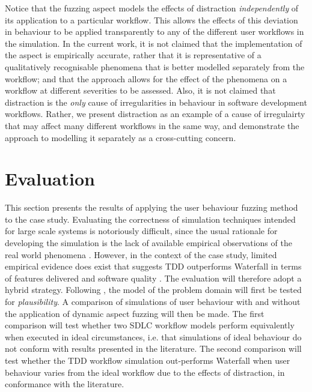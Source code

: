 \documentclass{llncs}
\begin{document}
Notice that the fuzzing aspect models the effects of distraction \emph{independently} of its application to a particular
workflow.  This allows the effects of this deviation in behaviour to be applied transparently to any of the different
user workflows in the simulation. In the current work, it is not claimed that the implementation of the aspect is
empirically accurate, rather that it is representative of a qualitatively recognisable phenomena that is better modelled
separately from the workflow; and that the approach allows for the effect of the phenomena on a workflow at different
severities to be assessed.  Also, it is not claimed that distraction is the \emph{only} cause of irregularities in
behaviour in software development workflows.  Rather, we present distraction as an example of a cause of irregulairty
that may affect many different workflows in the same way, and demonstrate the approach to modelling it separately as a
cross-cutting concern.
 

\section{Evaluation}
\label{sec:evaluation}


This section presents the results of applying the user behaviour fuzzing method to the case study.  Evaluating the
correctness of simulation techniques intended for large scale systems is notoriously difficult, since the usual
rationale for developing the simulation is the lack of available empirical observations of the real world phenomena
\citet{naylor67verification}.  However, in the context of the case study, limited empirical evidence does exist that
suggests TDD outperforms Waterfall in terms of features delivered and software quality
\citep{Bhat2006TestDrivenDevelopment,George2004TestDrivenDevelopment,Huang2009EmpiricalTestFirstProgramming}.  The
evaluation will therefore adopt a hybrid strategy. Following \citet{naylor67verification}, the model of the problem
domain will first be tested for \emph{plausibility}.  A comparison of simulations of user behaviour with and without the
application of dynamic aspect fuzzing will then be made.  The first comparison will test whether two SDLC workflow
models perform equivalently when executed in ideal circumstances, i.e. that simulations of ideal behaviour do not
conform with results presented in the literature. The second comparison will test whether the TDD workflow simulation
out-performs Waterfall when user behaviour varies from the ideal workflow due to the effects of distraction, in
conformance with the literature.
\end{document}
